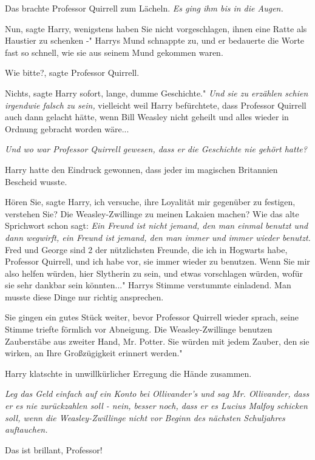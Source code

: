 Das brachte Professor Quirrell zum Lächeln.\emph{ Es ging ihm bis in die Augen.}

\glqq{}Nun\grqq{}, sagte Harry, \glqq{}wenigstens haben Sie nicht vorgeschlagen,
ihnen eine Ratte als Haustier zu schenken -" Harrys Mund schnappte zu, und er
bedauerte die Worte fast so schnell, wie sie aus seinem Mund gekommen waren.

\glqq{}Wie bitte?\grqq{}, sagte Professor Quirrell.

\glqq{}Nichts\grqq{}, sagte Harry sofort, \glqq{}lange, dumme Geschichte."
\emph{Und sie zu erzählen schien irgendwie falsch zu sein,} vielleicht weil
Harry befürchtete, dass Professor Quirrell auch dann gelacht hätte, wenn Bill
Weasley nicht geheilt und alles wieder in Ordnung gebracht worden wäre...

\emph{Und wo war Professor Quirrell gewesen, dass er die Geschichte nie gehört
hatte?}

Harry hatte den Eindruck gewonnen, dass jeder im magischen Britannien Bescheid
wusste.

\glqq{}Hören Sie\grqq{}, sagte Harry, \glqq{}ich versuche, ihre Loyalität mir
gegenüber zu festigen, verstehen Sie? Die Weasley-Zwillinge zu meinen Lakaien
machen? Wie das alte Sprichwort schon sagt: \emph{Ein Freund ist nicht jemand,
den man einmal benutzt und dann wegwirft, ein Freund ist jemand, den man immer
und immer wieder benutzt.} Fred und George sind 2 der nützlichsten Freunde, die
ich in Hogwarts habe, Professor Quirrell, und ich habe vor, sie immer wieder zu
benutzen. Wenn Sie mir also helfen würden, hier Slytherin zu sein, und etwas
vorschlagen würden, wofür sie sehr dankbar sein könnten..." Harrys Stimme
verstummte einladend. Man musste diese Dinge nur richtig ansprechen.

Sie gingen ein gutes Stück weiter, bevor Professor Quirrell wieder sprach, seine
Stimme triefte förmlich vor Abneigung. \glqq{}Die Weasley-Zwillinge benutzen
Zauberstäbe aus zweiter Hand, Mr. Potter. Sie würden mit jedem Zauber, den sie
wirken, an Ihre Großzügigkeit erinnert werden."

Harry klatschte in unwillkürlicher Erregung die Hände zusammen.

\emph{Leg das Geld einfach auf ein Konto bei Ollivander's und sag Mr.
Ollivander, dass er es nie zurückzahlen soll - nein, besser noch, dass er es
Lucius Malfoy schicken soll, wenn die Weasley-Zwillinge nicht vor Beginn des
nächsten Schuljahres auftauchen.}

\glqq{}Das ist brillant, Professor!\grqq{}

